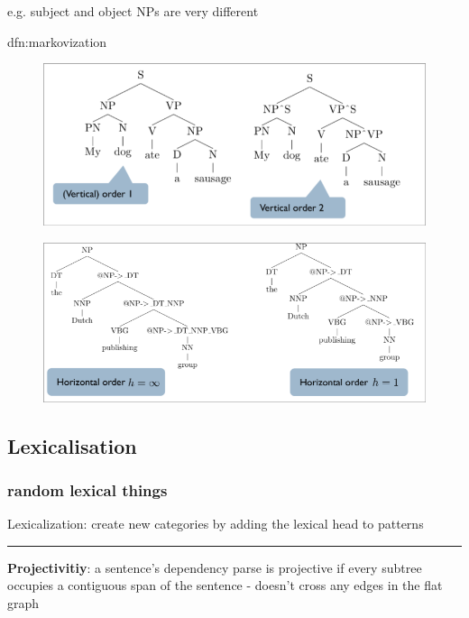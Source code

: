 \documentclass[landscape, 8pt]{extarticle}
\begin{document}
\begin{multicols}{3}
e.g. subject and object NPs are very different

\begin{dfn}{dfn:markovization}{}
    \begin{figure}[H]
        \centering
        \includegraphics[width=\linewidth]{images/2024-05-10-190351_hyprshot.png}
    \end{figure}
    \begin{figure}[H]
        \centering
        \includegraphics[width=\linewidth]{images/2024-05-10-190523_hyprshot.png}
    \end{figure}
\end{dfn}


\subsection{Lexicalisation}

\subsubsection{random lexical things}

Lexicalization: create new categories by adding the lexical head to patterns
\noindent\rule{0.325\textwidth}{0.2pt}

\textbf{Projectivitiy}: a sentence's dependency parse is projective if every subtree occupies a contiguous span of the sentence - doesn't cross any edges in the flat graph



\end{multicols}
\end{document}
